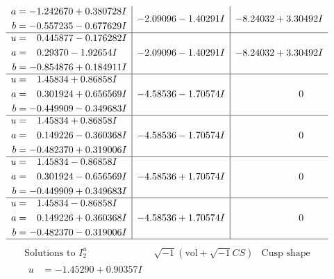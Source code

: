 \documentclass[1p]{elsarticle_modified}
\theoremstyle{definition}
\newcommand{\I}{\sqrt{-1}}
\begin{document}
$$\begin{array}{c|c|c}
\begin{aligned}
a &= -1.242670 + 0.380728 I \\
b &= -0.557235 - 0.677629 I\end{aligned}
 & -2.09096 - 1.40291 I & -8.24032 + 3.30492 I \\ \hline\begin{aligned}
u &= \phantom{-}0.445877 - 0.176282 I \\
a &= \phantom{-}0.29370 - 1.92654 I \\
b &= -0.854876 + 0.184911 I\end{aligned}
 & -2.09096 - 1.40291 I & -8.24032 + 3.30492 I \\ \hline\begin{aligned}
u &= \phantom{-}1.45834 + 0.86858 I \\
a &= \phantom{-}0.301924 + 0.656569 I \\
b &= -0.449909 - 0.349683 I\end{aligned}
 & -4.58536 - 1.70574 I & \phantom{-0.000000 } 0 \\ \hline\begin{aligned}
u &= \phantom{-}1.45834 + 0.86858 I \\
a &= \phantom{-}0.149226 - 0.360368 I \\
b &= -0.482370 + 0.319006 I\end{aligned}
 & -4.58536 - 1.70574 I & \phantom{-0.000000 } 0 \\ \hline\begin{aligned}
u &= \phantom{-}1.45834 - 0.86858 I \\
a &= \phantom{-}0.301924 - 0.656569 I \\
b &= -0.449909 + 0.349683 I\end{aligned}
 & -4.58536 + 1.70574 I & \phantom{-0.000000 } 0 \\ \hline\begin{aligned}
u &= \phantom{-}1.45834 - 0.86858 I \\
a &= \phantom{-}0.149226 + 0.360368 I \\
b &= -0.482370 - 0.319006 I\end{aligned}
 & -4.58536 + 1.70574 I & \phantom{-0.000000 } 0\\
 \hline 
 \end{array}$$\newpage$$\begin{array}{c|c|c}  
\text{Solutions to }I^u_{2}& \I (\text{vol} + \sqrt{-1}CS) & \text{Cusp shape}\\
 \hline 
\begin{aligned}
u &= -1.45290 + 0.90357 I \\

\end{aligned}
\end{array}$$
\end{document}

